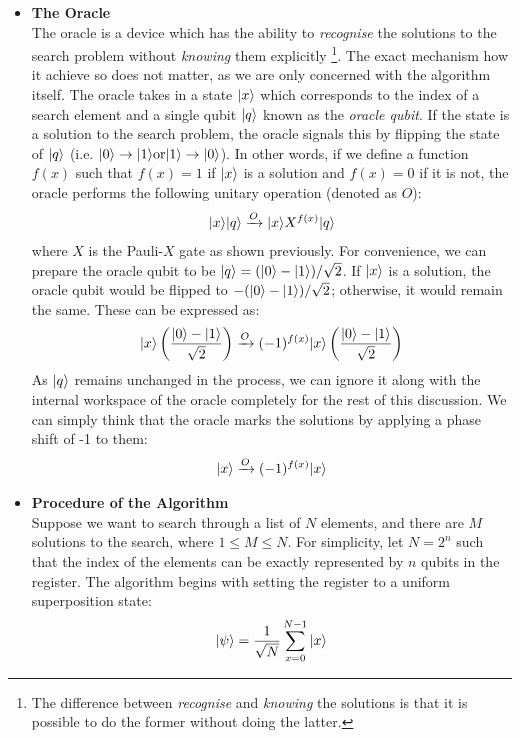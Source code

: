 \documentclass[bibliography=totocnumbered, 10pt]{article}
\theoremstyle{NoticeStyle}
\begin{document}
\begin{itemize}
\item[] \textbf{The Oracle}\\
The oracle is a device which has the ability to \emph{recognise} the solutions to the search problem without \emph{knowing} them explicitly \footnote{The difference between \emph{recognise} and \emph{knowing} the solutions is that it is possible to do the former without doing the latter.}. The exact mechanism how it achieve so does not matter, as we are only concerned with the algorithm itself. The oracle takes in a state ${\left\vert{x}\right\rangle}$ which corresponds to the index of a search element and a single qubit ${\left\vert{q}\right\rangle}$ known as the \emph{oracle qubit}. If the state is a solution to the search problem, the oracle signals this by flipping the state of ${\left\vert{q}\right\rangle}$ (i.e. ${\left\vert{0}\right\rangle} \rightarrow {\left\vert{1}\right\rangle} \textrm{or} {\left\vert{1}\right\rangle} \rightarrow {\left\vert{0}\right\rangle}$). In other words, if we define a function $f(x)$ such that $f(x) = 1$ if ${\left\vert{x}\right\rangle}$ is a solution and $f(x) = 0$ if it is not, the oracle performs the following unitary operation (denoted as $O$):
\begin{align}
	{\left\vert{x}\right\rangle} {\left\vert{q}\right\rangle} \xrightarrow{O} {\left\vert{x}\right\rangle} X^{f(x)} {\left\vert{q}\right\rangle}
\end{align}
where $X$ is the Pauli-$X$ gate as shown previously. For convenience, we can prepare the oracle qubit to be ${\left\vert{q}\right\rangle} = ({\left\vert{0}\right\rangle} - {\left\vert{1}\right\rangle}) / \sqrt{2}$. If ${\left\vert{x}\right\rangle}$ is a solution, the oracle qubit would be flipped to $- ({\left\vert{0}\right\rangle} - {\left\vert{1}\right\rangle}) / \sqrt{2}$; otherwise, it would remain the same. These can be expressed as:
\begin{align}
	{\left\vert{x}\right\rangle} \left(\frac{{\left\vert{0}\right\rangle} - {\left\vert{1}\right\rangle}}{\sqrt{2}}\right) \xrightarrow{O} (-1)^{f(x)}{\left\vert{x}\right\rangle}\left(\frac{{\left\vert{0}\right\rangle} - {\left\vert{1}\right\rangle}}{\sqrt{2}}\right)
\end{align}
As ${\left\vert{q}\right\rangle}$ remains unchanged in the process, we can ignore it along with the internal workspace of the oracle completely for the rest of this discussion. We can simply think that the oracle marks the solutions by applying a phase shift of -1 to them:
\begin{align}
	{\left\vert{x}\right\rangle} \xrightarrow{O} (-1)^{f(x)}{\left\vert{x}\right\rangle} 
\end{align}

\item[] \textbf{Procedure of the Algorithm}\\
Suppose we want to search through a list of $N$ elements, and there are $M$ solutions to the search, where $ 1 \leq M \leq N$. For simplicity, let $N = 2^n$ such that the index of the elements can be exactly represented by $n$ qubits in the register. The algorithm begins with setting the register to a uniform superposition state:
\begin{align}
	{\left\vert{\psi}\right\rangle} = \frac{1}{\sqrt{N}} \sum_{x=0}^{N-1} {\left\vert{x}\right\rangle}
\end{align}


\end{itemize}
\end{document}
